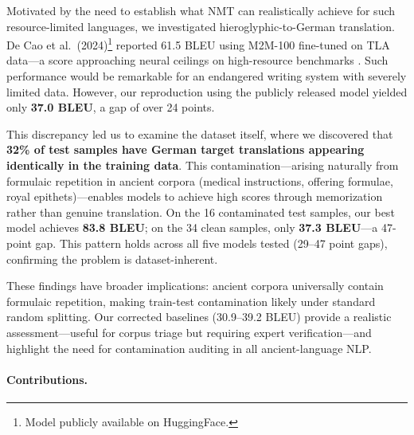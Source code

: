\documentclass[11pt,a4paper]{article}
\begin{document}
Motivated by the need to establish what NMT can realistically achieve for such resource-limited languages, we investigated hieroglyphic-to-German translation. De Cao et al.\ (2024)\footnote{Model publicly available on HuggingFace.} reported 61.5 BLEU using M2M-100 \citep{fan2021beyond} fine-tuned on TLA data---a score approaching neural ceilings on high-resource benchmarks \citep{popel2020transforming}. Such performance would be remarkable for an endangered writing system with severely limited data. However, our reproduction using the publicly released model yielded only \textbf{37.0 BLEU}, a gap of over 24 points.

This discrepancy led us to examine the dataset itself, where we discovered that \textbf{32\% of test samples have German target translations appearing identically in the training data}. This contamination---arising naturally from formulaic repetition in ancient corpora (medical instructions, offering formulae, royal epithets)---enables models to achieve high scores through memorization rather than genuine translation. On the 16 contaminated test samples, our best model achieves \textbf{83.8 BLEU}; on the 34 clean samples, only \textbf{37.3 BLEU}---a 47-point gap. This pattern holds across all five models tested (29--47 point gaps), confirming the problem is dataset-inherent.

These findings have broader implications: ancient corpora universally contain formulaic repetition, making train-test contamination likely under standard random splitting. Our corrected baselines (30.9--39.2 BLEU) provide a realistic assessment---useful for corpus triage but requiring expert verification---and highlight the need for contamination auditing in all ancient-language NLP.

\paragraph{Contributions.}
\end{document}
